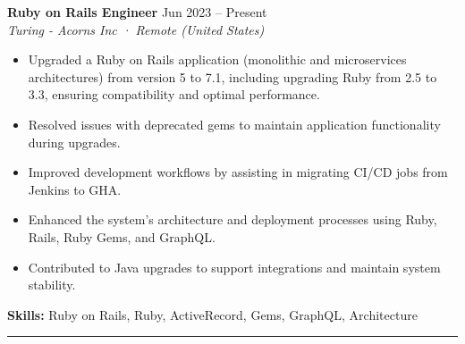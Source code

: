 \textbf{Ruby on Rails Engineer} \hfill Jun 2023 -- Present\\
\textit{Turing - Acorns Inc · Remote (United States)}\\
\begin{itemize}
    \setlength{\itemsep}{0pt} %
    \setlength{\topsep}{0pt}  %
    \setlength{\parsep}{0pt}  %
    \setlength{\partopsep}{0pt} %
    \item Upgraded a Ruby on Rails application (monolithic and microservices architectures) from version 5 to 7.1, including upgrading Ruby from 2.5 to 3.3, ensuring compatibility and optimal performance.
    \item Resolved issues with deprecated gems to maintain application functionality during upgrades.
    \item Improved development workflows by assisting in migrating CI/CD jobs from Jenkins to GHA.
    \item Enhanced the system's architecture and deployment processes using Ruby, Rails, Ruby Gems, and GraphQL.
    \item Contributed to Java upgrades to support integrations and maintain system stability.
\end{itemize}
\textbf{Skills:} Ruby on Rails, Ruby, ActiveRecord, Gems, GraphQL, Architecture
\hrule
\vspace{1em}
